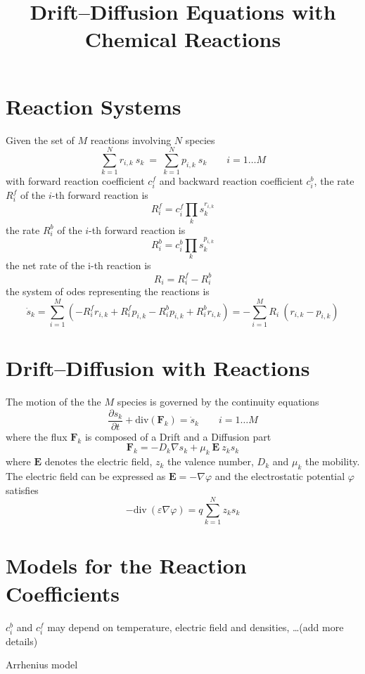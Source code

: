 \documentclass[11pt]{amsart}
\title{Drift--Diffusion Equations with Chemical Reactions}
\author{}
\begin{document}
\maketitle

\section{Reaction Systems}

Given the set of $M$ reactions involving $N$ species
\[
\sum_{k=1}^{N} r_{i,k}\ s_k\ =\ \sum_{k=1}^{N} p_{i,k}\ s_k \qquad  i=1\ldots M
\]
with forward reaction coefficient $c^f_i$ and backward reaction coefficient $c^b_i$,
the rate $R^{f}_i$ of the $i$-th forward reaction is 
$$
 R^{f}_i = c^{f}_i \prod_k s_k^{ r_{i,k} }
$$
the rate $R^{b}_i$ of the $i$-th forward reaction is 
$$
 R^{b}_i = c^{b}_i \prod_k s_k^{ p_{i,k} }
$$
the net rate of the i-th reaction is 
$$
R_i = R^{f}_i - R^{b}_i
$$
the system of odes representing the reactions is
$$
\dot{s}_k = \sum_{i=1}^M \left( - R^{f}_i r_{i,k} + R^{f}_i p_{i,k}
             - R^{b}_i p_{i,k} + R^{b}_i r_{i,k} \right) =
             - \sum_{i=1}^M  R_i\ (r_{i,k} - p_{i,k}) 
$$

\section{Drift--Diffusion with Reactions}

The motion of the the $M$ species is governed by the continuity equations
$$
\dfrac{\partial s_{k}}{\partial t} + \mathrm{div} \left( \mathbf{F}_{k} \right) = \dot{s}_k  \qquad  i=1\ldots M
$$
where the flux $\mathbf{F}_{k}$ is composed of a Drift and a Diffusion part
$$
\mathbf{F}_{k} = - D_{k} \nabla s_{k} + \mu_{k}\ \mathbf{E}\ z_{k} s_{k}
$$
where $\mathbf{E}$ denotes the electric field, $z_{k}$ the valence number, $D_{k}$ and $\mu_{k}$ the mobility.
The electric field can be expressed as $\mathbf{E} = - \nabla \varphi$ and the electrostatic potential $\varphi$ 
satisfies
$$
-\mathrm{div}\ \left( \varepsilon \nabla \varphi \right) = q \sum_{k=1}^{N} z_{k} s_{k}
$$

\section{Models for the Reaction Coefficients}

$c^{b}_i$ and $c^{f}_i$ may depend on temperature, electric field and densities, \dots(add more details) 

Arrhenius model
\end{document}
